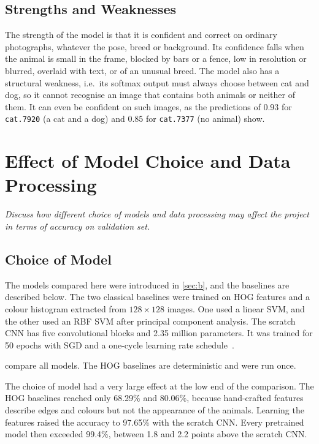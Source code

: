 \documentclass[11pt,a4paper]{article}
\newenvironment{question}
  {\par\smallskip\noindent\begin{lrbox}{\questionbox}%
   \begin{minipage}{\dimexpr\linewidth-2\fboxsep-2\fboxrule\relax}\small\itshape}
  {\end{minipage}\end{lrbox}%
   \fcolorbox{gray!45}{gray!7}{\usebox{\questionbox}}\par\smallskip}
\newcommand{\pct}[1]{#1\%}
\begin{document}
\subsection*{Strengths and Weaknesses}

The strength of the model is that it is confident and correct on ordinary photographs, whatever the pose, breed or background. Its confidence falls when the animal is small in the frame, blocked by bars or a fence, low in resolution or blurred, overlaid with text, or of an unusual breed. The model also has a structural weakness, i.e.\ its softmax output must always choose between cat and dog, so it cannot recognise an image that contains both animals or neither of them. It can even be confident on such images, as the predictions of 0.93 for \texttt{cat.7920} (a cat and a dog) and 0.85 for \texttt{cat.7377} (no animal) show.

\section{Effect of Model Choice and Data Processing}\label{sec:f}

\begin{question}
Discuss how different choice of models and data processing may affect the project in terms of accuracy on validation set.
\end{question}

\subsection*{Choice of Model}

The models compared here were introduced in \cref{sec:b}, and the baselines are described below. The two classical baselines were trained on HOG features and a colour histogram extracted from $128 \times 128$ images. One used a linear SVM, and the other used an RBF SVM after principal component analysis. The scratch CNN has five convolutional blocks and 2.35 million parameters. It was trained for 50 epochs with SGD and a one-cycle learning rate schedule~\cite{smith2019onecycle}.

 compare all models. The HOG baselines are deterministic and were run once.

The choice of model had a very large effect at the low end of the comparison. The HOG baselines reached only \pct{68.29} and \pct{80.06}, because hand-crafted features describe edges and colours but not the appearance of the animals. Learning the features raised the accuracy to \pct{97.65} with the scratch CNN. Every pretrained model then exceeded \pct{99.4}, between 1.8 and 2.2 points above the scratch CNN.
\end{document}
